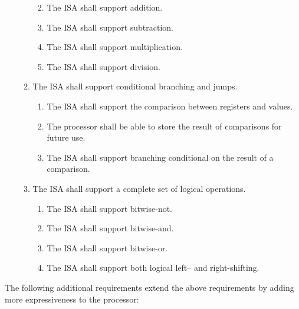 \documentclass{article}
\begin{document}
\begin{enumerate}[label=R\arabic*]
\begin{enumerate}[label=\theenumi.\arabic*]
\begin{enumerate}[label=\theenumii.\arabic*]
\begin{enumerate}[label=\theenumiii.\arabic*]
            \end{enumerate}
            \item The ISA shall support addition.
            \item The ISA shall support subtraction.
            \item The ISA shall support multiplication.
            \item The ISA shall support division.
        \end{enumerate}
        \item The ISA shall support conditional branching and jumps.
        \begin{enumerate}[label=\theenumii.\arabic*]
            \item The ISA shall support the comparison between registers and values.
            \item The processor shall be able to store the result of comparisons for future use.
            \item The ISA shall support branching conditional on the result of a comparison.
        \end{enumerate}
        \item The ISA shall support a complete set of logical operations.
        \begin{enumerate}[label=\theenumii.\arabic*]
            \item The ISA shall support bitwise-not.
            \item The ISA shall support bitwise-and.
            \item The ISA shall support bitwise-or.
            \item The ISA shall support both logical left-- and right-shifting.
        \end{enumerate}
    \end{enumerate}
\end{enumerate}
\medskip

The following additional requirements extend the above requirements by adding more expressiveness to the processor:
\end{document}
